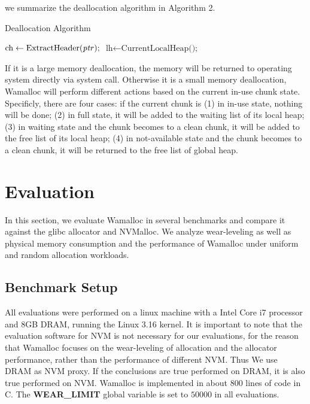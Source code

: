 \documentclass[10pt, conference, compsocconf]{IEEEtran}
\begin{document}
we summarize the deallocation algorithm in Algorithm 2.

\begin{algorithm}
\caption{Deallocation Algorithm}\label{euclid}
\begin{algorithmic}[1]

\State $\text{ch} \gets \text{ExtractHeader(\textit{ptr});}$
\State $\text{lh} \gets \text{CurrentLocalHeap();}$

\State {}
\Else
\State {}
\EndIf

\EndProcedure
\end{algorithmic}
\end{algorithm}

If it is a large memory deallocation, the memory will be returned to operating system directly via system call.
Otherwise it is a small memory deallocation, Wamalloc will perform different actions based on the current in-use chunk state.
Specificly, there are four cases: if the current chunk is 
(1) in in-use state, nothing will be done;
(2) in full state, it will be added to the waiting list of its local heap;
(3) in waiting state and the chunk becomes to a clean chunk, it will be added to the free list of its local heap;
(4) in not-available state and the chunk becomes to a clean chunk, it will be returned to the free list of global heap.

\section{Evaluation}

In this section, we evaluate Wamalloc in several benchmarks and compare it against the glibc allocator and NVMalloc.
We analyze wear-leveling as well as physical memory consumption and the performance of Wamalloc 
under uniform and random allocation workloads.

\subsection{Benchmark Setup}

All evaluations were performed on a linux machine with a Intel Core i7 processor and 8GB DRAM, running the Linux 3.16 kernel.
It is important to note that the evaluation software for NVM is not necessary for our evaluations, 
for the reason that Wamalloc focuses on the wear-leveling of allocation and the allocator performance, rather than the performance of different NVM.
Thus We use DRAM as NVM proxy.
If the conclusions are true performed on DRAM, it is also true performed on NVM.
Wamalloc is implemented in about 800 lines of code in C.
The \textbf{WEAR\_LIMIT} global variable is set to $50000$ in all evaluations.
\end{document}
